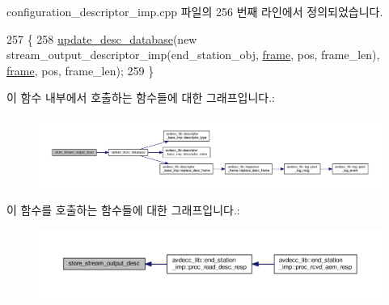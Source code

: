 configuration\+\_\+descriptor\+\_\+imp.\+cpp 파일의 256 번째 라인에서 정의되었습니다.


\begin{DoxyCode}
257 \{
258     \hyperlink{classavdecc__lib_1_1configuration__descriptor__imp_a98445251711b644b6da09d2354003778}{update\_desc\_database}(\textcolor{keyword}{new} stream\_output\_descriptor\_imp(end\_station\_obj, 
      \hyperlink{gst__avb__playbin_8c_ac8e710e0b5e994c0545d75d69868c6f0}{frame}, pos, frame\_len), \hyperlink{gst__avb__playbin_8c_ac8e710e0b5e994c0545d75d69868c6f0}{frame}, pos, frame\_len);
259 \}
\end{DoxyCode}


이 함수 내부에서 호출하는 함수들에 대한 그래프입니다.\+:
\nopagebreak
\begin{figure}[H]
\begin{center}
\leavevmode
\includegraphics[width=350pt]{classavdecc__lib_1_1configuration__descriptor__imp_ad04053f0d6c74300147dff1b44e5f3a6_cgraph}
\end{center}
\end{figure}




이 함수를 호출하는 함수들에 대한 그래프입니다.\+:
\nopagebreak
\begin{figure}[H]
\begin{center}
\leavevmode
\includegraphics[width=350pt]{classavdecc__lib_1_1configuration__descriptor__imp_ad04053f0d6c74300147dff1b44e5f3a6_icgraph}
\end{center}
\end{figure}


